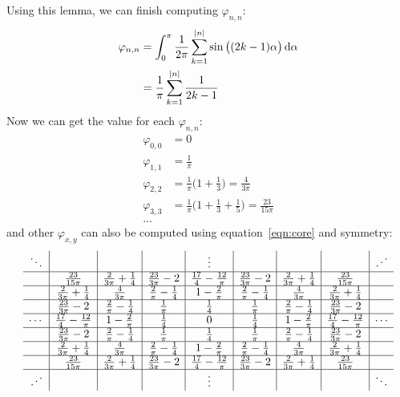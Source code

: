 \documentclass[10pt,a4paper,draft]{article}
\begin{document}
	Using this lemma, we can finish computing $\varphi_{n,n}$:
	\begin{align*}
	\varphi_{n,n}&=\int^\pi_0 \frac{1}{2\pi}\sum_{k=1}^{|n|} \sin\big((2k-1)\alpha\big)\,\mathrm{d}\alpha\\
	&=\frac{1}{\pi}\sum_{k=1}^{|n|}\frac{1}{2k-1}
	\end{align*}
	Now we can get the value for each $\varphi_{n,n}$:
	\begin{align*}
	\varphi_{0,0}&=0\\
	\varphi_{1,1}&=\frac{1}{\pi}\\
	\varphi_{2,2}&=\frac{1}{\pi}\bigg(1+\frac{1}{3}\bigg)=\frac{4}{3\pi}\\
	\varphi_{3,3}&=\frac{1}{\pi}\bigg(1+\frac{1}{3}+\frac{1}{5}\bigg)=\frac{23}{15\pi}\\
	...
	\end{align*}
	and other $\varphi_{x,y}$ can also be computed using equation~\eqref{eqn:core} and symmetry:
	\[
	\begin{array}{c|c|c|c|c|c|c|c|c}
	\ddots & & & & \vdots & & & & \iddots\\
	\hline
	& \frac{23}{15\pi} & \frac{2}{3\pi}+\frac{1}{4} & \frac{23}{3\pi}-2 & \frac{17}{4}-\frac{12}{\pi} & \frac{23}{3\pi}-2 & \frac{2}{3\pi}+\frac{1}{4} & \frac{23}{15\pi} &\\
	\hline
	& \frac{2}{3\pi}+\frac{1}{4} & \frac{4}{3\pi} & \frac{2}{\pi}-\frac{1}{4} & 1-\frac{2}{\pi} & \frac{2}{\pi}-\frac{1}{4} & \frac{4}{3\pi} & \frac{2}{3\pi}+\frac{1}{4} &\\
	\hline
	& \frac{23}{3\pi}-2 & \frac{2}{\pi}-\frac{1}{4} & \frac{1}{\pi} & \frac{1}{4} & \frac{1}{\pi} & \frac{2}{\pi}-\frac{1}{4} & \frac{23}{3\pi}-2 &\\
	\hline
	\cdots & \frac{17}{4}-\frac{12}{\pi} & 1-\frac{2}{\pi} & \frac{1}{4} & 0 & \frac{1}{4} & 1-\frac{2}{\pi} & \frac{17}{4}-\frac{12}{\pi} & \cdots\\
	\hline
	& \frac{23}{3\pi}-2 & \frac{2}{\pi}-\frac{1}{4} & \frac{1}{\pi} & \frac{1}{4} & \frac{1}{\pi} & \frac{2}{\pi}-\frac{1}{4} & \frac{23}{3\pi}-2 &\\
	\hline
	& \frac{2}{3\pi}+\frac{1}{4} & \frac{4}{3\pi} & \frac{2}{\pi}-\frac{1}{4} & 1-\frac{2}{\pi} & \frac{2}{\pi}-\frac{1}{4} & \frac{4}{3\pi} & \frac{2}{3\pi}+\frac{1}{4} &\\
	\hline
	& \frac{23}{15\pi} & \frac{2}{3\pi}+\frac{1}{4} & \frac{23}{3\pi}-2 & \frac{17}{4}-\frac{12}{\pi} & \frac{23}{3\pi}-2 & \frac{2}{3\pi}+\frac{1}{4} & \frac{23}{15\pi} &\\
	\hline
	\iddots & & & &\vdots & & & &\ddots
	\end{array}
	\]
	
\end{document}
